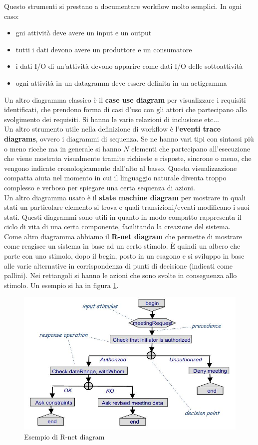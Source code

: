 \documentclass[a4paper,12pt, oneside]{book}
\begin{document}
Questo strumenti si prestano a documentare workflow molto semplici. In ogni
caso:
\begin{itemize}
  \item gni attività deve avere un input e un output 
  \item tutti i dati devono avere un produttore e un consumatore 
  \item i dati I/O di un'attività devono apparire come dati I/O delle
  sottoattività 
  \item ogni attività in un datagramm deve essere definita in un actigramma
\end{itemize}
Un altro diagramma classico è il \textbf{case use diagram} per
visualizzare i requisiti identificati, che prendono forma di casi d'uso con gli
attori che partecipano allo svolgimento dei requisiti. Si hanno le varie
relazioni di inclusione etc$\ldots$\\
Un altro strumento utile nella definizione di workflow è l'\textbf{eventi trace
  diagrams}, ovvero i diagrammi di sequenza. Se ne hanno vari tipi con sintassi
più o meno ricche ma in generale si hanno $N$ elementi che partecipano
all'esecuzione che viene mostrata visualmente tramite richieste e risposte,
sincrone o meno, che vengono indicate cronologicamente dall'alto al
basso. Questa visualizzazione compatta aiuta nel momento in cui il linguaggio
naturale diventa troppo complesso e verboso per spiegare una certa sequenza di
azioni. \\
Un altro diagramma usato è il \textbf{state machine diagram} per mostrare in
quali stati un particolare elemento si trova e quali transizioni/eventi
modificano i suoi stati. Questi diagrammi sono utili in quanto in modo compatto
rappresenta il ciclo di vita di una certa componente, facilitando la creazione
del sistema. \\
Come altro diagramma abbiamo il \textbf{R-net diagram} che permette di mostrare
come reagisce un sistema in base ad un certo stimolo. È quindi un albero che
parte con uno stimolo, dopo il begin, posto in un esagono e si sviluppo in base
alle varie alternative in corrispondenza di punti di decisione (indicati come
pallini). Nei rettangoli si hanno le azioni che sono svolte in conseguenza allo
stimolo. Un esempio si ha in figura \ref{fig:rnet}.
\begin{figure}
  \centering
  \includegraphics[scale = 0.5]{img/rnet.jpg}
  \caption{Esempio di R-net diagram}
  \label{fig:rnet}
\end{figure}
\end{document}
